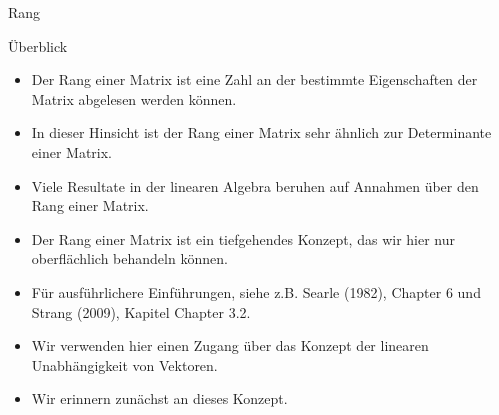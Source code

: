 \documentclass[
  8pt,
  ignorenonframetext,
]{beamer}
\providecommand{\tightlist}{%
  \setlength{\itemsep}{0pt}\setlength{\parskip}{0pt}}
\begin{document}
\begin{frame}{Rang}
\protect\hypertarget{rang}{}
\small

Überblick

\footnotesize
{}

\begin{itemize}
\tightlist
\item
  Der Rang einer Matrix ist eine Zahl an der bestimmte Eigenschaften der
  Matrix abgelesen werden können.
\item
  In dieser Hinsicht ist der Rang einer Matrix sehr ähnlich zur
  Determinante einer Matrix.
\item
  Viele Resultate in der linearen Algebra beruhen auf Annahmen über den
  Rang einer Matrix.
\item
  Der Rang einer Matrix ist ein tiefgehendes Konzept, das wir hier nur
  oberflächlich behandeln können.
\item
  Für ausführlichere Einführungen, siehe z.B. Searle (1982), Chapter 6
  und Strang (2009), Kapitel Chapter 3.2.
\item
  Wir verwenden hier einen Zugang über das Konzept der linearen
  Unabhängigkeit von Vektoren.
\item
  Wir erinnern zunächst an dieses Konzept.
\end{itemize}
\end{frame}
\end{document}
